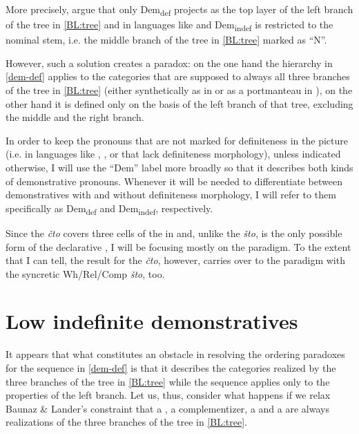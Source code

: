 More precisely, \cite{BaunazLander2018} argue that only Dem\textsubscript{def} projects as the top layer of the left branch of the tree in \ref{BL:tree} and in languages like  and  Dem\textsubscript{indef} is restricted to the nominal stem, i.e. the middle branch of the tree in \ref{BL:tree} marked as ``N''. 
\par
However, such a solution creates a paradox: on the one hand the hierarchy in \ref{dem-def} 
applies to the categories that are supposed to always  all three branches of the tree in \ref{BL:tree} (either synthetically as in  or as a portmanteau in ), on the other hand it is defined only on the basis of the left branch of that tree, excluding the middle and the right branch.
\par
 In order to keep the  pronouns that are not marked for definiteness in the picture (i.e. in  languages like , , or  that lack definiteness morphology), unless indicated otherwise, I will use the ``Dem'' label more broadly so that it describes both kinds of demonstrative pronouns. Whenever it will be needed to differentiate between demonstratives with and without definiteness morphology, I will refer to them specifically as Dem\textsubscript{def} and Dem\textsubscript{indef}, respectively.
 \par
Since the  \textit{\v{c}to} covers three cells of the  in   and, unlike the  \textit{\v{s}to}, is the only possible form of the declarative , I will be focusing mostly on the  paradigm. To the extent that I can tell, the result for the  \textit{\v{c}to}, however, carries over to the  paradigm with the syncretic Wh/Rel/Comp \textit{\v{s}to}, too.

\section{Low indefinite demonstratives}

\noindent It appears that what constitutes an obstacle in resolving the ordering paradoxes for the sequence in \ref{dem-def} is that it describes the categories realized by the three branches of the tree in \ref{BL:tree} while the sequence applies only to the properties of the left branch. Let us, thus, consider what happens if we relax Baunaz \& Lander's constraint that a , a complementizer, a  and a  are always realizations of the three branches of the tree in \ref{BL:tree}.

